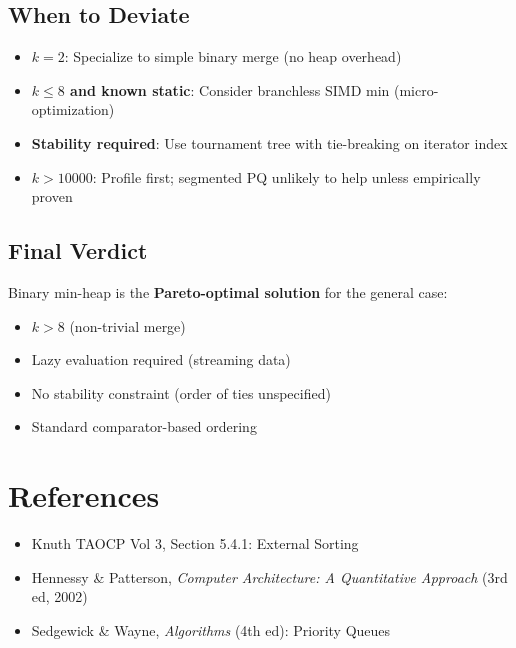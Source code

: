 \documentclass[11pt]{article}
\begin{document}
\subsection{When to Deviate}

\begin{itemize}
    \item \textbf{$k = 2$}: Specialize to simple binary merge (no heap overhead)
    \item \textbf{$k \leq 8$ and known static}: Consider branchless SIMD min (micro-optimization)
    \item \textbf{Stability required}: Use tournament tree with tie-breaking on iterator index
    \item \textbf{$k > 10000$}: Profile first; segmented PQ unlikely to help unless empirically proven
\end{itemize}

\subsection{Final Verdict}

Binary min-heap is the \textbf{Pareto-optimal solution} for the general case:
\begin{itemize}
    \item $k > 8$ (non-trivial merge)
    \item Lazy evaluation required (streaming data)
    \item No stability constraint (order of ties unspecified)
    \item Standard comparator-based ordering
\end{itemize}

\section{References}

\begin{itemize}
    \item Knuth TAOCP Vol 3, Section 5.4.1: External Sorting
    \item Hennessy \& Patterson, \textit{Computer Architecture: A Quantitative Approach} (3rd ed, 2002)
    \item Sedgewick \& Wayne, \textit{Algorithms} (4th ed): Priority Queues
\end{itemize}
\end{document}
